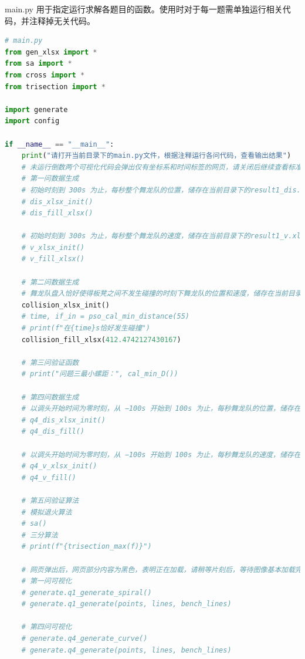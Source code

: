 \documentclass[a4paper]{article}
\begin{document}
	main.py 用于指定运行求解各题目的函数。使用时对于每一题需单独运行相关代码，并注释掉无关代码。
	\begin{lstlisting}[language=python,columns=fullflexible,frame=shadowbox]
# main.py
from gen_xlsx import *
from sa import *
from cross import *
from trisection import *

import generate
import config

if __name__ == "__main__":
	print("请打开当前目录下的main.py文件，根据注释运行各问代码，查看输出结果")
	# 未运行倒数两个可视化代码会弹出仅有坐标系和时间标签的网页，请关闭后继续查看标准输出框的结果
	# 第一问数据生成
	# 初始时刻到 300s 为止，每秒整个舞龙队的位置，储存在当前目录下的result1_dis.xlsx中
	# dis_xlsx_init()
	# dis_fill_xlsx()
	
	# 初始时刻到 300s 为止，每秒整个舞龙队的速度，储存在当前目录下的result1_v.xlsx中
	# v_xlsx_init()
	# v_fill_xlsx()
	
	# 第二问数据生成
	# 舞龙队盘入恰好使得板凳之间不发生碰撞的时刻下舞龙队的位置和速度，储存在当前目录下的result2.xlsx中
	collision_xlsx_init()
	# time, if_in = pso_cal_min_distance(55)
	# print(f"在{time}s恰好发生碰撞")
	collision_fill_xlsx(412.4742127430167)
	
	# 第三问验证函数
	# print("问题三最小螺距：", cal_min_D())
	
	# 第四问数据生成
	# 以调头开始时间为零时刻，从 −100s 开始到 100s 为止，每秒舞龙队的位置，储存在当前目录下的result4_dis.xlsx中
	# q4_dis_xlsx_init()
	# q4_dis_fill()
	
	# 以调头开始时间为零时刻，从 −100s 开始到 100s 为止，每秒舞龙队的速度，储存在当前目录下的result4_v.xlsx中
	# q4_v_xlsx_init()
	# q4_v_fill()
	
	# 第五问验证算法
	# 模拟退火算法
	# sa()
	# 三分算法
	# print(f"{trisection_max(f)}")
	
	# 网页弹出后，网页部分内容为黑色，表明正在加载，请稍等片刻后，等待图像基本加载完毕，使用鼠标拖动边框或在可视化界面中滑动滚轮调节图像大小
	# 第一问可视化
	# generate.q1_generate_spiral()
	# generate.q1_generate(points, lines, bench_lines)
	
	# 第四问可视化
	# generate.q4_generate_curve()
	# generate.q4_generate(points, lines, bench_lines)
 	\end{lstlisting}
 	
\end{document}
